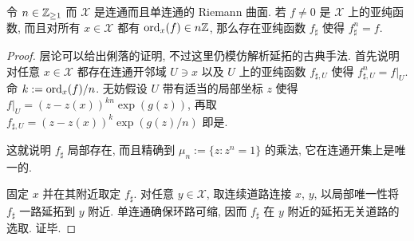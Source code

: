 \begin{lemma}\label{prop:Cousin}
	令 $n \in \mathbb{Z}_{\geq 1}$ 而 $\mathcal{X}$ 是连通而且单连通的 Riemann 曲面. 若 $f \neq 0$ 是 $\mathcal{X}$ 上的亚纯函数, 而且对所有 $x \in \mathcal{X}$ 都有 $\operatorname*{ord}_x(f) \in n\mathbb{Z}$, 那么存在亚纯函数 $f_\sharp$ 使得 $f_\sharp^n = f$.
\end{lemma}
\begin{proof}
	层论可以给出俐落的证明, 不过这里仍模仿解析延拓的古典手法. 首先说明对任意 $x \in \mathcal{X}$ 都存在连通开邻域 $U \ni x$ 以及 $U$ 上的亚纯函数 $f_{\sharp,U}$ 使得 $f_{\sharp, U}^n = f|_U$. 命 $k := \operatorname*{ord}_x(f)/n$. 无妨假设 $U$ 带有适当的局部坐标 $z$ 使得 $f|_U = (z - z(x))^{kn} \exp(g(z))$, 再取 $f_{\sharp, U} = (z - z(x))^k \exp(g(z)/n)$ 即是.
	
	这就说明 $f_\sharp$ 局部存在, 而且精确到 $\mu_n := \{z: z^n=1 \}$ 的乘法, 它在连通开集上是唯一的.

	固定 $x$ 并在其附近取定 $f_\sharp$. 对任意 $y \in \mathcal{X}$, 取连续道路连接 $x$, $y$, 以局部唯一性将 $f_\sharp$ 一路延拓到 $y$ 附近. 单连通确保环路可缩, 因而 $f_\sharp$ 在 $y$ 附近的延拓无关道路的选取. 证毕.
\end{proof}

